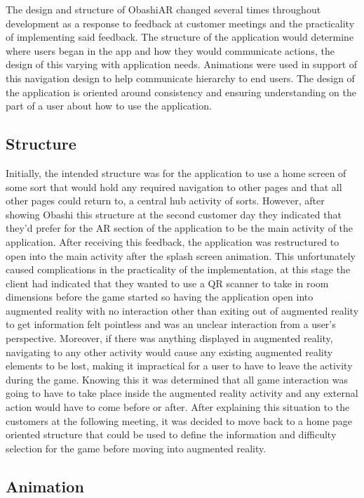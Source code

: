 \documentclass{l3proj}
\begin{document}
The design and structure of ObashiAR changed several times throughout development as a response to feedback at customer meetings and the practicality of implementing said feedback. The structure of the application would determine where users began in the app and how they would communicate actions, the design of this varying with application needs. Animations were used in support of this navigation design to help communicate hierarchy to end users. The design of the application is oriented around consistency and ensuring understanding on the part of a user about how to use the application. 

\subsection{Structure}

Initially, the intended structure was for the application to use a home screen of some sort that would hold any required navigation to other pages and that all other pages could return to, a central hub activity of sorts. However, after showing Obashi this structure at the second customer day they indicated that they’d prefer for the AR section of the application to be the main activity of the application. After receiving this feedback, the application was restructured to open into the main activity after the splash screen animation. This unfortunately caused complications in the practicality of the implementation, at this stage the client had indicated that they wanted to use a QR scanner to take in room dimensions before the game started so having the application open into augmented reality with no interaction other than exiting out of augmented reality to get information felt pointless and was an unclear interaction from a user's perspective. Moreover, if there was anything displayed in augmented reality, navigating to any other activity would cause any existing augmented reality elements to be lost, making it impractical for a user to have to leave the activity during the game. Knowing this it was determined that all game interaction was going to have to take place inside the augmented reality activity and any external action would have to come before or after. After explaining this situation to the customers at the following meeting, it was decided to move back to a home page oriented structure that could be used to define the information and difficulty selection for the game before moving into augmented reality. 

\subsection{Animation}
\end{document}

